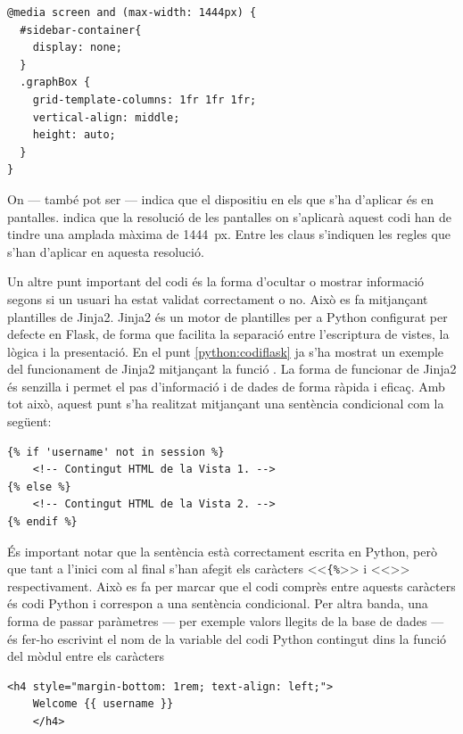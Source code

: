 \documentclass{tfgitic}[2022/06/30]
\begin{document}
\begin{lstlisting}[style = css]
@media screen and (max-width: 1444px) {
  #sidebar-container{
    display: none;
  }
  .graphBox {
    grid-template-columns: 1fr 1fr 1fr;
    vertical-align: middle;
    height: auto;
  }
}
\end{lstlisting}

On  --- també pot ser  --- indica que el dispositiu en els que s'ha d'aplicar és en pantalles.  indica que la resolució de les pantalles on s'aplicarà aquest codi han de tindre una amplada màxima de \SI{1444}{px}. Entre les claus s'indiquen les regles que s'han d'aplicar en aquesta resolució.

Un altre punt important del codi  és la forma d'ocultar o mostrar informació segons si un usuari ha estat validat correctament o no. Això es fa mitjançant plantilles de Jinja2. Jinja2 és un motor de plantilles per a Python configurat per defecte en Flask, de forma que facilita la separació entre l'escriptura de vistes, la lògica i la presentació. En el punt \ref{python:codiflask} ja s'ha mostrat un exemple del funcionament de Jinja2 mitjançant la funció . La forma de funcionar de Jinja2 és senzilla i permet el pas d'informació i de dades de forma ràpida i eficaç. Amb tot això, aquest punt s'ha realitzat mitjançant una sentència condicional com la següent:

\begin{lstlisting}[style = html]
{% if 'username' not in session %}
    <!-- Contingut HTML de la Vista 1. -->
{% else %}
    <!-- Contingut HTML de la Vista 2. -->
{% endif %}
\end{lstlisting}

És important notar que la sentència  està correctament escrita en Python, però que tant a l'inici com al final s'han afegit els caràcters <<\texttt{\{\%}>> i <<\fitx{\%\}}>> respectivament. Això es fa per marcar que el codi comprès entre aquests caràcters és codi Python i correspon a una sentència condicional. Per altra banda, una forma de passar paràmetres --- per exemple valors llegits de la base de dades --- és fer-ho escrivint el nom de la variable del codi Python contingut dins la funció del mòdul  entre els caràcters %

\begin{lstlisting}[style = html]
<h4 style="margin-bottom: 1rem; text-align: left;">
    Welcome {{ username }}
    </h4>
\end{lstlisting}
\end{document}
